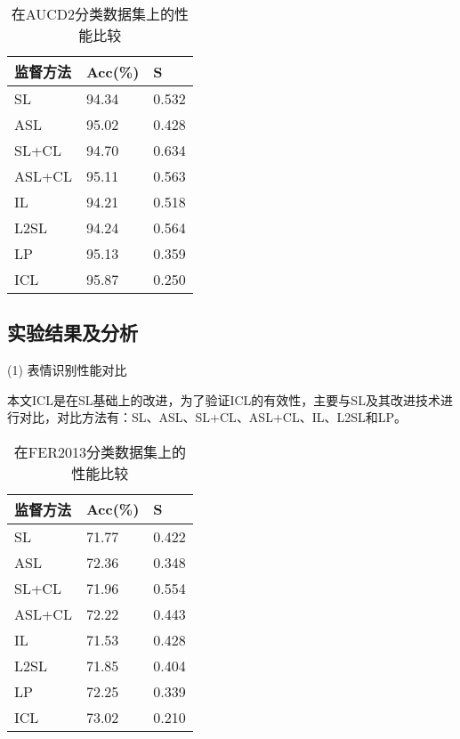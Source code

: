 \begin{table}[!ht]
	\caption{在AUCD2分类数据集上的性能比较}
	\label{表4.1}
	\renewcommand{\arraystretch}{1.5}
	\centering
	\begin{tabular}{p{3.5cm}<{\centering}p{3.5cm}<{\centering}p{3.5cm}<{\centering}}
		\bottomrule
		监督方法   & Acc(\%) & S \\ \hline
		SL     & 94.34                            & 0.532                      \\
		ASL    & 95.02                            & 0.428                      \\
		SL+CL  & 94.70                            & 0.634                      \\
		ASL+CL & 95.11                            & 0.563                      \\
		IL     & 94.21                            & 0.518                      \\
		L2SL   & 94.24                            & 0.564                      \\
		LP     & 95.13                            & 0.359                      \\
		ICL    & 95.87                            & 0.250                      \\ 
		\bottomrule
	\end{tabular}
\end{table}

\subsection{实验结果及分析}

(1)	表情识别性能对比

本文ICL是在SL基础上的改进，为了验证ICL的有效性，主要与SL及其改进技术进行对比，对比方法有：SL、ASL\cite{66}、SL+CL\cite{63}、ASL+CL、IL\cite{69}、L2SL\cite{68}和LP\cite{62}。


\begin{table}[!ht]
	\caption{在FER2013分类数据集上的性能比较}
	\label{表4.2}
	\renewcommand{\arraystretch}{1.5}
	\centering
	\begin{tabular}{p{3.5cm}<{\centering}p{3.5cm}<{\centering}p{3.5cm}<{\centering}}
		\bottomrule
		监督方法   & Acc(\%) & S     \\ 
		\hline
		SL     & 71.77   & 0.422 \\
		ASL    & 72.36   & 0.348 \\
		SL+CL  & 71.96   & 0.554 \\
		ASL+CL & 72.22   & 0.443 \\
		IL     & 71.53   & 0.428 \\
		L2SL   & 71.85   & 0.404 \\
		LP     & 72.25   & 0.339 \\
		ICL    & 73.02   & 0.210 \\ 
		\bottomrule
	\end{tabular}
\end{table}



